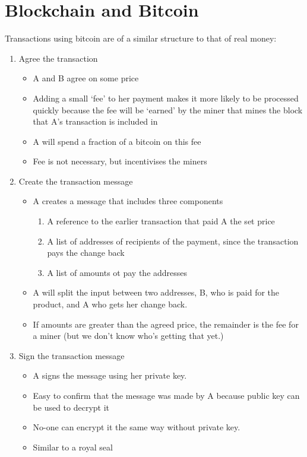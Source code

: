 \documentclass[11pt,a4paper,titlepage,dvipsnames,cmyk]{scrartcl}
\begin{document}
\section{Blockchain and Bitcoin}
Transactions using bitcoin are of a similar structure to that of real money:
\begin{enumerate}
\item Agree the transaction
\begin{itemize}
    \item A and B agree on some price
    \item Adding a small `fee' to her payment makes it more likely to be processed quickly because the fee will be `earned' by the miner that mines the block that A's transaction is included in
    \item A will spend a fraction of a bitcoin on this fee
    \item Fee is not necessary, but incentivises the miners
\end{itemize}
\item Create the transaction message
\begin{itemize}
    \item A creates a message that includes three components
    \begin{enumerate}
    \item A reference to the earlier transaction that paid A the set price
    \item A list of addresses of recipients of the payment, since the transaction pays the change back
    \item A list of amounts ot pay the addresses
    \end{enumerate}
    \item A will split the input between two addresses, B, who is paid for the product, and A who gets her change back.
    \item If amounts are greater than the agreed price, the remainder is the fee for a miner (but we don't know who's getting that yet.)
\end{itemize}
\item Sign the transaction message
\begin{itemize}
    \item A signs the message using her private key.
    \item Easy to confirm that the message was made by A because public key can be used to decrypt it
    \item No-one can encrypt it the same way without private key.
    \item Similar to a royal seal

\end{itemize}
\end{enumerate}
\end{document}
